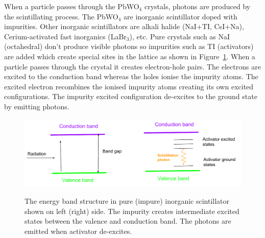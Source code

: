 When a particle passes through the PbWO$_4$ crystals, photons are produced by the
scintillating process. The PbWO$_4$ are inorganic scintillator doped with impurities.
Other inorganic scintillators are alkali halide (NaI+TI, CsI+Na), 
Cerium-activated fast inorganics (LaBr$_3$), etc. Pure crystals such as NaI (octahedral) 
don't produce visible photons so impurities such as TI (activators) are added which 
create special sites in the lattice as shown in Figure~\ref{fig:cms_sinti}. When a
particle passes through the crystal it creates electron-hole pairs. The electrons are 
excited to the conduction band whereas the holes ionise the impurity atoms. The excited 
electron recombines the ionised impurity atoms creating its own excited configurations.
The impurity excited configuration de-excites to the ground state by emitting photons. 
\begin{figure}
  \centering
  {\includegraphics[width=1.0\linewidth]{Experiment/CMS/Image/ECAL/Scintillation.pdf}}
	\caption{The energy band structure in pure (impure) inorganic scintillator shown
	on left (right) side. The impurity creates intermediate excited states between
	the valence and conduction band. The photons are emitted when activator 
	de-excites.}
  \label{fig:cms_sinti}
\end{figure}

